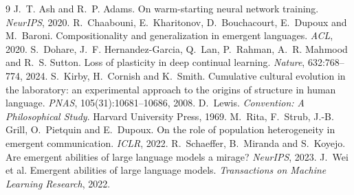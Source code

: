 \documentclass[11pt]{article}
\begin{document}
\begin{thebibliography}{9}\small
{} J.~T. Ash and R.~P. Adams. On warm-starting neural network training.
  \emph{NeurIPS}, 2020.
 R.~Chaabouni, E.~Kharitonov, D.~Bouchacourt, E.~Dupoux and M.~Baroni.
  Compositionality and generalization in emergent languages. \emph{ACL}, 2020.
 S.~Dohare, J.~F. Hernandez-Garcia, Q.~Lan, P.~Rahman, A.~R. Mahmood and
  R.~S. Sutton. Loss of plasticity in deep continual learning. \emph{Nature}, 632:768--774, 2024.
 S.~Kirby, H.~Cornish and K.~Smith. Cumulative cultural evolution in the
  laboratory: an experimental approach to the origins of structure in human language.
  \emph{PNAS}, 105(31):10681--10686, 2008.
 D.~Lewis. \emph{Convention: A Philosophical Study}. Harvard University
  Press, 1969.
 M.~Rita, F.~Strub, J.-B. Grill, O.~Pietquin and E.~Dupoux. On the role of
  population heterogeneity in emergent communication. \emph{ICLR}, 2022.
 R.~Schaeffer, B.~Miranda and S.~Koyejo. Are emergent abilities of large
  language models a mirage? \emph{NeurIPS}, 2023.
 J.~Wei et al. Emergent abilities of large language models.
  \emph{Transactions on Machine Learning Research}, 2022.
\end{thebibliography}
\end{document}
